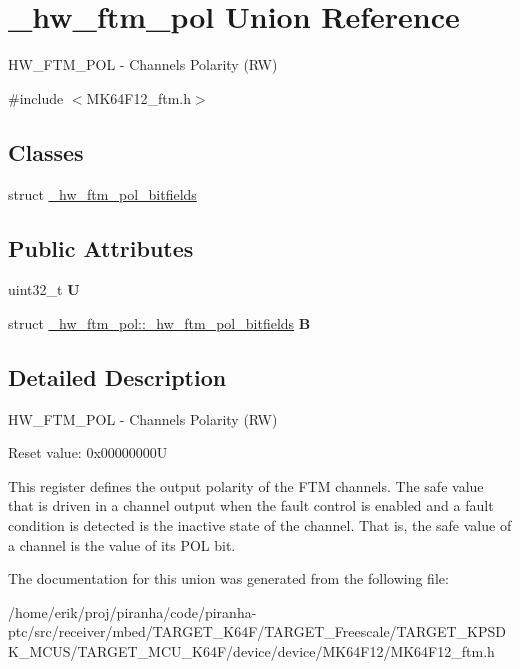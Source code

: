 \hypertarget{union__hw__ftm__pol}{}\section{\+\_\+hw\+\_\+ftm\+\_\+pol Union Reference}
\label{union__hw__ftm__pol}


H\+W\+\_\+\+F\+T\+M\+\_\+\+P\+OL -\/ Channels Polarity (RW)  




{\ttfamily \#include $<$M\+K64\+F12\+\_\+ftm.\+h$>$}

\subsection*{Classes}
\begin{DoxyCompactItemize}
\item 
struct \hyperlink{struct__hw__ftm__pol_1_1__hw__ftm__pol__bitfields}{\+\_\+hw\+\_\+ftm\+\_\+pol\+\_\+bitfields}
\end{DoxyCompactItemize}
\subsection*{Public Attributes}
\begin{DoxyCompactItemize}
\item 
uint32\+\_\+t {\bfseries U}\hypertarget{union__hw__ftm__pol_ad4cb8d7988e59bb8db22bed0203acd1b}{}\label{union__hw__ftm__pol_ad4cb8d7988e59bb8db22bed0203acd1b}

\item 
struct \hyperlink{struct__hw__ftm__pol_1_1__hw__ftm__pol__bitfields}{\+\_\+hw\+\_\+ftm\+\_\+pol\+::\+\_\+hw\+\_\+ftm\+\_\+pol\+\_\+bitfields} {\bfseries B}\hypertarget{union__hw__ftm__pol_a11baa4d95d617efcf144681dc5af5312}{}\label{union__hw__ftm__pol_a11baa4d95d617efcf144681dc5af5312}

\end{DoxyCompactItemize}


\subsection{Detailed Description}
H\+W\+\_\+\+F\+T\+M\+\_\+\+P\+OL -\/ Channels Polarity (RW) 

Reset value\+: 0x00000000U

This register defines the output polarity of the F\+TM channels. The safe value that is driven in a channel output when the fault control is enabled and a fault condition is detected is the inactive state of the channel. That is, the safe value of a channel is the value of its P\+OL bit. 

The documentation for this union was generated from the following file\+:\begin{DoxyCompactItemize}
\item 
/home/erik/proj/piranha/code/piranha-\/ptc/src/receiver/mbed/\+T\+A\+R\+G\+E\+T\+\_\+\+K64\+F/\+T\+A\+R\+G\+E\+T\+\_\+\+Freescale/\+T\+A\+R\+G\+E\+T\+\_\+\+K\+P\+S\+D\+K\+\_\+\+M\+C\+U\+S/\+T\+A\+R\+G\+E\+T\+\_\+\+M\+C\+U\+\_\+\+K64\+F/device/device/\+M\+K64\+F12/M\+K64\+F12\+\_\+ftm.\+h\end{DoxyCompactItemize}
